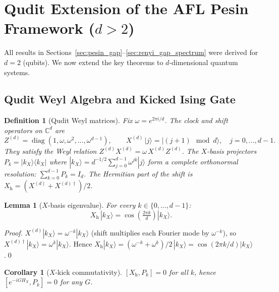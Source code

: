 \documentclass[12pt,a4paper]{article}
\newtheorem{lemma}[theorem]{Lemma}
\newtheorem{corollary}[theorem]{Corollary}
\newtheorem{definition}[theorem]{Definition}
\begin{document}
\section{Qudit Extension of the AFL Pesin Framework ($d>2$)}\label{sec:qudit}

All results in Sections~\ref{sec:pesin_gap}--\ref{sec:renyi_gap_spectrum} were
derived for $d=2$ (qubits).  We now extend the key theorems to $d$-dimensional
quantum systems.

\subsection{Qudit Weyl Algebra and Kicked Ising Gate}

\begin{definition}[Qudit Weyl matrices]
Fix $\omega = e^{2\pi i/d}$.  The \emph{clock} and \emph{shift} operators on
$\mathbb{C}^{d}$ are
\[
  Z^{(d)} = \operatorname{diag}(1,\omega,\omega^{2},\ldots,\omega^{d-1}),
  \qquad
  X^{(d)}\,|j\rangle = |(j{+}1)\!\!\mod d\rangle,\quad j=0,\ldots,d{-}1.
\]
They satisfy the Weyl relation $Z^{(d)} X^{(d)} = \omega\, X^{(d)} Z^{(d)}$.
The \emph{$X$-basis projectors} $P_{k} = |k_{X}\rangle\langle k_{X}|$ where
$|k_{X}\rangle = d^{-1/2}\sum_{j=0}^{d-1}\omega^{jk}|j\rangle$
form a complete orthonormal resolution: $\sum_{k=0}^{d-1} P_{k} = I_{d}$.
The Hermitian part of the shift is $X_{\mathrm{h}} = (X^{(d)} + X^{(d)\dagger})/2$.
\end{definition}

\begin{lemma}[$X$-basis eigenvalue]\label{lem:xh_eigval}
For every $k\in\{0,\ldots,d{-}1\}$:
\[
  X_{\mathrm{h}}\,|k_{X}\rangle = \cos\!\left(\tfrac{2\pi k}{d}\right)|k_{X}\rangle.
\]
\end{lemma}

\begin{proof}
$X^{(d)}|k_{X}\rangle = \omega^{-k}|k_{X}\rangle$ (shift multiplies each
Fourier mode by $\omega^{-k}$), so $X^{(d)\dagger}|k_{X}\rangle = \omega^{k}|k_{X}\rangle$.
Hence $X_{\mathrm{h}}|k_{X}\rangle = (\omega^{-k}+\omega^{k})/2\,|k_{X}\rangle
= \cos(2\pi k/d)|k_{X}\rangle$.\qed
\end{proof}

\begin{corollary}[$X$-kick commutativity]\label{cor:xkick_comm}
$[X_{\mathrm{h}}, P_{k}] = 0$ for all $k$, hence
$[e^{-iG H_{X}}, P_{k}] = 0$ for any $G$.
\end{corollary}
\end{document}

